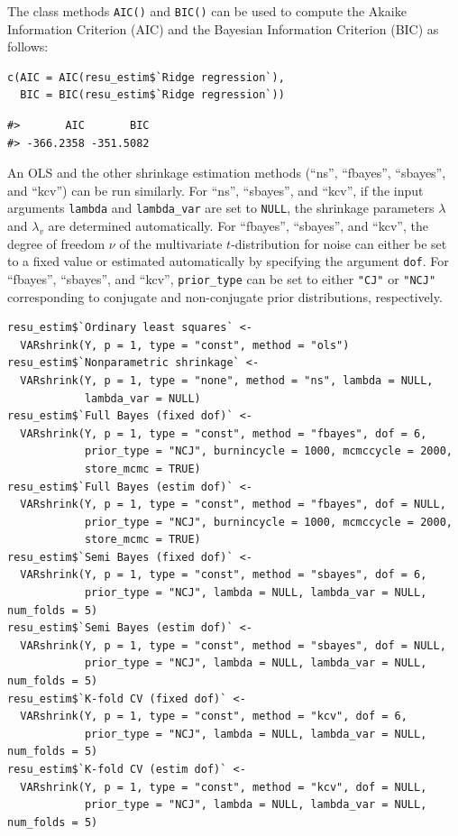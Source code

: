 The class methods \texttt{AIC()} and \texttt{BIC()} can be used to compute the Akaike Information Criterion (AIC) and the Bayesian Information Criterion (BIC) as follows:

\begin{verbatim}
c(AIC = AIC(resu_estim$`Ridge regression`),
  BIC = BIC(resu_estim$`Ridge regression`))
\end{verbatim}

\begin{verbatim}
#>       AIC       BIC 
#> -366.2358 -351.5082
\end{verbatim}

An OLS and the other shrinkage estimation methods (``ns'',
``fbayes'', ``sbayes'', and ``kcv'') can be run similarly. For ``ns'',
``sbayes'', and ``kcv'', if the input arguments \texttt{lambda} and \texttt{lambda\_var}
are set to \texttt{NULL}, the shrinkage parameters \(\lambda\) and \(\lambda_v\)
are determined automatically.
For ``fbayes'', ``sbayes'', and ``kcv'', the degree of freedom \(\nu\) of the multivariate \(t\)-distribution for noise can either be set to a fixed value or estimated automatically by specifying the argument \texttt{dof}.
For ``fbayes'', ``sbayes'', and ``kcv'', \texttt{prior\_type} can be set to either \texttt{"CJ"} or \texttt{"NCJ"} corresponding to conjugate and non-conjugate prior distributions, respectively.

\begin{verbatim}
resu_estim$`Ordinary least squares` <-
  VARshrink(Y, p = 1, type = "const", method = "ols")
resu_estim$`Nonparametric shrinkage` <-
  VARshrink(Y, p = 1, type = "none", method = "ns", lambda = NULL,
            lambda_var = NULL)
resu_estim$`Full Bayes (fixed dof)` <-
  VARshrink(Y, p = 1, type = "const", method = "fbayes", dof = 6,
            prior_type = "NCJ", burnincycle = 1000, mcmccycle = 2000,
            store_mcmc = TRUE)
resu_estim$`Full Bayes (estim dof)` <-
  VARshrink(Y, p = 1, type = "const", method = "fbayes", dof = NULL,
            prior_type = "NCJ", burnincycle = 1000, mcmccycle = 2000,
            store_mcmc = TRUE)
resu_estim$`Semi Bayes (fixed dof)` <-
  VARshrink(Y, p = 1, type = "const", method = "sbayes", dof = 6,
            prior_type = "NCJ", lambda = NULL, lambda_var = NULL, num_folds = 5)
resu_estim$`Semi Bayes (estim dof)` <-
  VARshrink(Y, p = 1, type = "const", method = "sbayes", dof = NULL,
            prior_type = "NCJ", lambda = NULL, lambda_var = NULL, num_folds = 5)
resu_estim$`K-fold CV (fixed dof)` <-
  VARshrink(Y, p = 1, type = "const", method = "kcv", dof = 6,
            prior_type = "NCJ", lambda = NULL, lambda_var = NULL, num_folds = 5)
resu_estim$`K-fold CV (estim dof)` <-
  VARshrink(Y, p = 1, type = "const", method = "kcv", dof = NULL,
            prior_type = "NCJ", lambda = NULL, lambda_var = NULL, num_folds = 5)
\end{verbatim}

